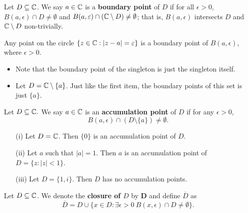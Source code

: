\documentclass[a4paper]{report}
\begin{document}
\begin{definition}
   Let \( D \subseteq  \mathbb{C}  \). We say \( a \in \mathbb{C}  \) is a \textbf{boundary point} of \( D  \) if for all \( \epsilon > 0  \), \( B(a,\epsilon) \cap D \neq \emptyset \) and \( B(a,\varepsilon) \cap (\mathbb{C} \setminus  D ) \neq \emptyset  \); that is, \( B(a,\epsilon) \) intersects \( D  \) and \( \mathbb{C} \setminus  D   \) non-trivially.  
\end{definition}

\begin{eg}
   Any point on the circle \( \{ z \in \mathbb{C} : | z - a  | = \varepsilon \}  \) is a boundary point of \( B(a,\epsilon) \), where \( \epsilon > 0  \).
\end{eg}

\begin{eg}
    \begin{itemize}
  \item  Note that the boundary point of the singleton is just the singleton itself.
    \item Let \( D = \mathbb{C} \setminus  \{ a  \}  \). Just like the first item, the boundary points of this set is just \( \{ a  \}  \). 
    \end{itemize}
\end{eg}

\begin{definition}
Let \( D \subseteq  \mathbb{C} . \) We say \( a \in \mathbb{C}  \) is an \textbf{accumulation point} of \( D  \) if for any \( \epsilon > 0  \),
\[  B(a,\epsilon) \cap (D \setminus  \{ a \} ) \neq \emptyset. \]

\end{definition}

\begin{eg}
    \begin{enumerate}
        \item[(i)] Let \( D = \mathbb{C}  \). Then \( \{ 0  \}  \) is an accumulation point of \( D  \).
        \item[(ii)] Let \( a  \) such that \( | a  |  = 1  \). Then \( a  \) is an accumulation point of \( D = \{ z : | z | < 1   \}  \).
        \item[(iii)] Let \( D = \{ 1,i \}  \). Then \( D  \) has no accumulation points.
    \end{enumerate}
\end{eg}

\label{Closure of a set}

\begin{definition}[Closure]
    Let \( D \subseteq \mathbb{C} \). We denote the \textbf{closure of \( D \)} by \( \textbf{D} \) and define \( \overline{D} \) as 
    \[  \overline{D} = D \cup \{ x \in D : \exists \epsilon > 0  \  B(x,\epsilon) \cap D \neq \emptyset \}.  \]
\end{definition}
\end{document}
